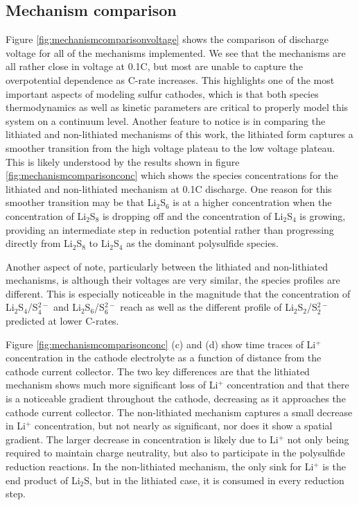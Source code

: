 \documentclass{elsarticle}
\begin{document}
\subsection{Mechanism comparison}
Figure \ref{fig:mechanismcomparisonvoltage} shows the comparison of discharge voltage for all of the mechanisms implemented. We see that the mechanisms are all rather close in voltage at 0.1C, but most are unable to capture the overpotential dependence as C-rate increases. This highlights one of the most important aspects of modeling sulfur cathodes, which is that both species thermodynamics as well as kinetic parameters are critical to properly model this system on a continuum level. Another feature to notice is in comparing the lithiated and non-lithiated mechanisms of this work, the lithiated form captures a smoother transition from the high voltage plateau to the low voltage plateau. This is likely understood by the results shown in figure \ref{fig:mechanismcomparisonconc} which shows the species concentrations for the lithiated and non-lithiated mechanism at 0.1C discharge. One reason for this smoother transition may be that Li$_2$S$_6$ is at a higher concentration when the concentration of Li$_2$S$_8$ is dropping off and the concentration of Li$_2$S$_4$ is growing, providing an intermediate step in reduction potential rather than progressing directly from Li$_2$S$_8$ to Li$_2$S$_4$ as the dominant polysulfide species. 

Another aspect of note, particularly between the lithiated and non-lithiated mechanisms, is although their voltages are very similar, the species profiles are different. This is especially noticeable in the magnitude that the concentration of Li$_2$S$_4$/S$_4^{2-}$ and Li$_2$S$_6$/S$_6^{2-}$ reach as well as the different profile of Li$_2$S$_2$/S$_2^{2-}$ predicted at lower C-rates. 

Figure \ref{fig:mechanismcomparisonconc} (c) and (d) show time traces of Li$^+$ concentration in the cathode electrolyte as a function of distance from the cathode current collector. The two key differences are that the lithiated mechanism shows much more significant loss of Li$^+$ concentration and that there is a noticeable gradient throughout the cathode, decreasing as it approaches the cathode current collector. The non-lithiated mechanism captures a small decrease in Li$^+$ concentration, but not nearly as significant, nor does it show a spatial gradient. The larger decrease in concentration is likely due to Li$^+$ not only being required to maintain charge neutrality, but also to participate in the polysulfide reduction reactions. In the non-lithiated mechanism, the only sink for Li$^+$ is the end product of Li$_2$S, but in the lithiated case, it is consumed in every reduction step. 
\end{document}

